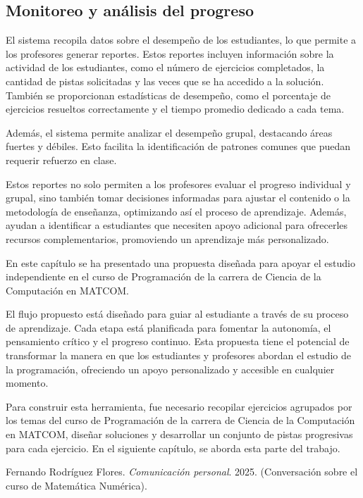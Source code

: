 \documentclass{article}
\begin{document}
\subsection{Monitoreo y análisis del progreso}

El sistema recopila datos sobre el desempeño de los estudiantes, lo que permite a los profesores generar reportes. Estos reportes incluyen información sobre la actividad de los estudiantes, como el número de ejercicios completados, la cantidad de pistas solicitadas y las veces que se ha accedido a la solución. También se proporcionan estadísticas de desempeño, como el porcentaje de ejercicios resueltos correctamente y el tiempo promedio dedicado a cada tema.

Además, el sistema permite analizar el desempeño grupal, destacando áreas fuertes y débiles. Esto facilita la identificación de patrones comunes que puedan requerir refuerzo en clase. 

Estos reportes no solo permiten a los profesores evaluar el progreso individual y grupal, sino también tomar decisiones informadas para ajustar el contenido o la metodología de enseñanza, optimizando así el proceso de aprendizaje. Además, ayudan a identificar a estudiantes que necesiten apoyo adicional para ofrecerles recursos complementarios, promoviendo un aprendizaje más personalizado.

En este capítulo se ha presentado una propuesta diseñada para apoyar el estudio independiente en el curso de Programación de la carrera de Ciencia de la Computación en \mbox{MATCOM}.

El flujo propuesto está diseñado para guiar al estudiante a través de su proceso de aprendizaje. Cada etapa está planificada para fomentar la autonomía, el pensamiento crítico y el progreso continuo. Esta propuesta tiene el potencial de transformar la manera en que los estudiantes y profesores abordan el estudio de la programación, ofreciendo un apoyo personalizado y accesible en cualquier momento.

Para construir esta herramienta, fue necesario recopilar ejercicios agrupados por los temas del curso de Programación de la carrera de Ciencia de la Computación en \mbox{MATCOM}, diseñar soluciones y desarrollar un conjunto de pistas progresivas para cada ejercicio. En el siguiente capítulo, se aborda esta parte del trabajo.

\begin{thebibliography}{99}

    Fernando Rodríguez Flores.
    \textit{Comunicación personal}. 
    2025. 
    (Conversación sobre el curso de Matemática Numérica).
  
\end{thebibliography}
\end{document}
